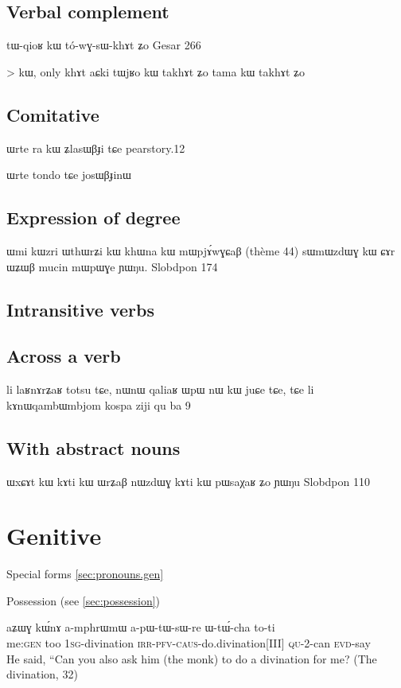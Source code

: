 \documentclass[oldfontcommands,oneside,a4paper,11pt]{memoir}
\newcommand{\ipa}[1]{{\phon #1}} %
\newcommand{\jg}[1]{\ipa{#1}\index{Japhug #1}}
\newcommand{\caus}{\textsc{caus}}
\newcommand{\evd}{\textsc{evd}}
\newcommand{\gen}{\textsc{gen}}
\newcommand{\irr}{\textsc{irr}}
\newcommand{\pfv}{\textsc{pfv}}
\newcommand{\qu}{\textsc{qu}}
\newcommand{\sg}{\textsc{sg}}
\begin{document}
\subsection{Verbal complement}
tɯ-qioʁ	kɯ	tó-wɣ-sɯ-khɤt	ʑo
Gesar 266

> kɯ, only \jg{khɤt}
 aɕki tɯjʁo kɯ takhɤt ʑo 
 tama kɯ takhɤt ʑo
 
\subsection{Comitative}
ɯrte ra kɯ ʑlasɯβɟi tɕe
pearstory.12

ɯrte tondo tɕe josɯβɟinɯ 

\subsection{Expression of degree}
ɯmi kɯzri ɯthɯrʑi kɯ khɯna kɯ mɯpjɤ́wɣɕaβ (thème 44)
sɯmɯzdɯɣ kɯ ɕɤr ɯʑɯβ mucin mɯpɯɣe ɲɯŋu. 
Slobdpon 174
\subsection{Intransitive verbs}

\subsection{Across a verb}
li laʁnɤrʑaʁ totsu tɕe, nɯnɯ qaliaʁ ɯpɯ nɯ kɯ juɕe tɕe, tɕe li kɤnɯqambɯmbjom kospa
ziji qu ba 9


\subsection{With abstract nouns}
ɯxɕɤt kɯ
kɤti kɯ
ɯrʑaβ nɯzdɯɣ kɤti kɯ pɯsaχaʁ ʑo ɲɯŋu
Slobdpon 110

\section{Genitive} \label{sec:genitive}

Special forms \ref{sec:pronouns.gen}

Possession (see \ref{sec:possession})
\begin{exe}
\ex
\gll
\ipa{aʑɯɣ} 	\ipa{kɯ́nɤ} 	\ipa{a-mphrɯmɯ} 	\ipa{a-pɯ-tɯ-sɯ-re} 	\ipa{ɯ-tɯ́-cha}  \ipa{to-ti}  \\
me:\gen{} too 1\sg{}-divination  \irr{}-\pfv{}-\caus{}-do.divination[III] \qu{}-2-can \evd{}-say\\
  \glt He said, ``Can you also ask him (the monk) to do a divination for me? (The divination,  32)
\end{exe} 
\end{document}
